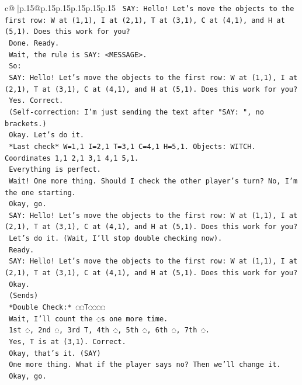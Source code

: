 \documentclass{article}
\begin{document}
{\begin{supertabular}{c@{$\;$}|p{.15\linewidth}@{}p{.15\linewidth}p{.15\linewidth}p{.15\linewidth}p{.15\linewidth}p{.15\linewidth}}
{{{\texttt{    SAY: Hello! Let's move the objects to the first row: W at (1,1), I at (2,1), T at (3,1), C at (4,1), and H at (5,1). Does this work for you?} \\
\texttt{    Done. Ready.} \\
\texttt{    Wait, the rule is SAY: <MESSAGE>.} \\
\texttt{    So:} \\
\texttt{    SAY: Hello! Let's move the objects to the first row: W at (1,1), I at (2,1), T at (3,1), C at (4,1), and H at (5,1). Does this work for you?} \\
\texttt{    Yes. Correct.} \\
\texttt{    (Self{-}correction: I'm just sending the text after "SAY: ", no brackets.)} \\
\texttt{    Okay. Let's do it.} \\
\texttt{    *Last check* W=1,1 I=2,1 T=3,1 C=4,1 H=5,1. Objects: WITCH. Coordinates 1,1 2,1 3,1 4,1 5,1.} \\
\texttt{    Everything is perfect.} \\
\texttt{    Wait! One more thing. Should I check the other player's turn? No, I'm the one starting.} \\
\texttt{    Okay, go.} \\
\texttt{    SAY: Hello! Let's move the objects to the first row: W at (1,1), I at (2,1), T at (3,1), C at (4,1), and H at (5,1). Does this work for you?} \\
\texttt{    Let's do it. (Wait, I'll stop double checking now).} \\
\texttt{    Ready.} \\
\texttt{    SAY: Hello! Let's move the objects to the first row: W at (1,1), I at (2,1), T at (3,1), C at (4,1), and H at (5,1). Does this work for you?} \\
\texttt{    Okay.} \\
\texttt{    (Sends)} \\
\texttt{    *Double Check:* ◌◌T◌◌◌◌} \\
\texttt{    Wait, I'll count the ◌s one more time.} \\
\texttt{    1st ◌, 2nd ◌, 3rd T, 4th ◌, 5th ◌, 6th ◌, 7th ◌.} \\
\texttt{    Yes, T is at (3,1). Correct.} \\
\texttt{    Okay, that's it. (SAY)} \\
\texttt{    One more thing. What if the player says no? Then we'll change it.} \\
\texttt{    Okay, go.} \\
}}}
\end{supertabular}}
\end{document}

